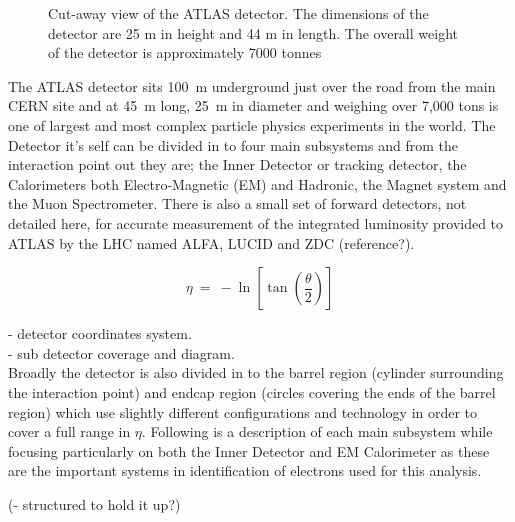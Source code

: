 	\begin{figure}[h]
		\begin{center}
		\end{center}
		\caption{Cut-away view of the ATLAS detector. The dimensions of the detector are 25 m in height and 44 m in length. The overall weight of the detector is approximately 7000 tonnes}
		\label{fig:ATLAS_cutaway}
	\end{figure}



	The ATLAS detector sits \SI{100}{\m} underground just over the road from the main CERN site and at \SI{45}{\m} long, \SI{25}{\m} in diameter and weighing over 7,000 tons is one of largest and most complex particle physics experiments in the world. The Detector it's self can be divided in to four main subsystems and from the interaction point out they are; the Inner Detector or tracking detector, the Calorimeters both Electro-Magnetic (EM) and Hadronic, the Magnet system and the Muon Spectrometer. There is also a small set of forward detectors, not detailed here, for accurate measurement of the integrated luminosity provided to ATLAS by the LHC named ALFA, LUCID and ZDC (reference?). 

	\begin{equation}
		\eta~=~-\ln[\tan(\frac{\theta}{2})]
	\end{equation}

	- detector coordinates system.\\
	- sub detector coverage and diagram.\\

	Broadly the detector is also divided in to the barrel region (cylinder surrounding the interaction point) and endcap region (circles covering the ends of the barrel region) which use slightly different configurations and technology in order to cover a full range in $\eta$.
	Following is a description of each main subsystem while focusing particularly on both the Inner Detector and EM Calorimeter as these are the important systems in identification of electrons used for this analysis.


	(- structured to hold it up?)

